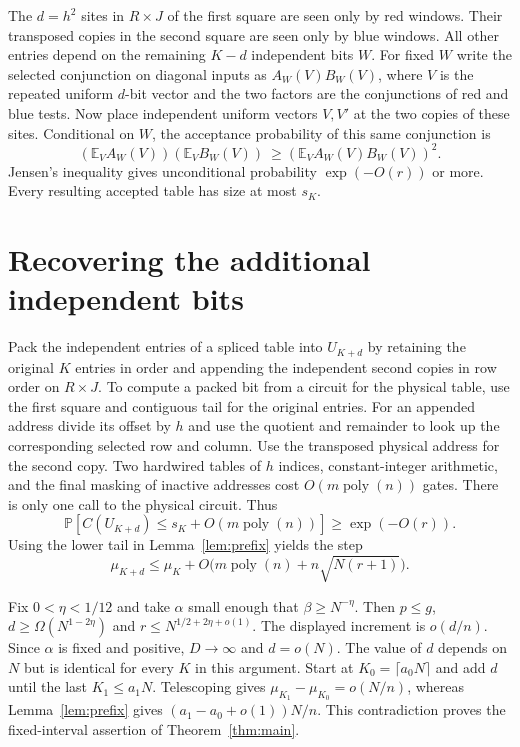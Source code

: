 \documentclass[11pt]{article}
\newcommand{\E}{\mathbb E}
\newcommand{\Prob}{\mathbb P}
\begin{document}
The $d=h^2$ sites in $R\times J$ of the first square are seen only by red windows. Their transposed copies in the second square are seen only by blue windows. All other entries depend on the remaining $K-d$ independent bits $W$. For fixed $W$ write the selected conjunction on diagonal inputs as $A_W(V)B_W(V)$, where $V$ is the repeated uniform $d$-bit vector and the two factors are the conjunctions of red and blue tests. Now place independent uniform vectors $V,V'$ at the two copies of these sites. Conditional on $W$, the acceptance probability of this same conjunction is
\[
 (\E_V A_W(V))(\E_V B_W(V))\ \ge (\E_V A_W(V)B_W(V))^2 .
\]
Jensen's inequality gives unconditional probability $\exp(-O(r))$ or more. Every resulting accepted table has size at most $s_K$.

\section{Recovering the additional independent bits}

Pack the independent entries of a spliced table into $U_{K+d}$ by retaining the original $K$ entries in order and appending the independent second copies in row order on $R\times J$. To compute a packed bit from a circuit for the physical table, use the first square and contiguous tail for the original entries. For an appended address divide its offset by $h$ and use the quotient and remainder to look up the corresponding selected row and column. Use the transposed physical address for the second copy. Two hardwired tables of $h$ indices, constant-integer arithmetic, and the final masking of inactive addresses cost $O(m\operatorname{poly}(n))$ gates. There is only one call to the physical circuit. Thus
\[
 \Prob[C(U_{K+d})\le s_K+O(m\operatorname{poly}(n))]\ge\exp(-O(r)).
\]
Using the lower tail in Lemma~\ref{lem:prefix} yields the step
\[
 \mu_{K+d}\le\mu_K + O\bigl(m\operatorname{poly}(n)+n\sqrt{N(r+1)}\bigr).
\]

Fix $0<\eta<1/12$ and take $\alpha$ small enough that $\beta\ge N^{-\eta}$. Then $p\le g$, $d\ge\Omega(N^{1-2\eta})$ and $r\le N^{1/2+2\eta+o(1)}$. The displayed increment is $o(d/n)$. Since $\alpha$ is fixed and positive, $D\to\infty$ and $d=o(N)$. The value of $d$ depends on $N$ but is identical for every $K$ in this argument. Start at $K_0=\lceil a_0N\rceil$ and add $d$ until the last $K_1\le a_1N$. Telescoping gives $\mu_{K_1}-\mu_{K_0}=o(N/n)$, whereas Lemma~\ref{lem:prefix} gives $(a_1-a_0+o(1))N/n$. This contradiction proves the fixed-interval assertion of Theorem~\ref{thm:main}.
\end{document}
